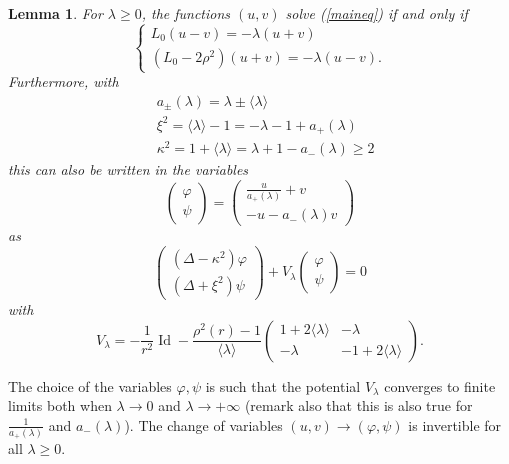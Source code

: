 \documentclass[11 pt]{amsart}
\newtheorem{lem}{Lemma}[section]
\theoremstyle{definition}
\theoremstyle{remark}
\numberwithin{equation}{section}
\begin{document}
\begin{lem}
  \label{pullyou}For $\lambda \geqslant 0$, the functions $(u, v)$ solve
  (\ref{maineq}) if and only if
  \begin{equation}
    \left\{\begin{array}{l}
      L_0 (u - v) = - \lambda (u + v)\\
      (L_0 - 2 \rho^2) (u + v) = - \lambda (u - v) .
    \end{array}\right. \label{maineq2}
  \end{equation}
  Furthermore, with
\begin{align*}
& a_{\pm} (\lambda) = \lambda \pm \langle \lambda \rangle \\
& \xi^2 = \langle \lambda \rangle - 1 = - \lambda - 1 + a_+ (\lambda)
\\ 
&\kappa^2 = 1 + \langle \lambda \rangle = \lambda + 1 - a_-
(\lambda) \geqslant 2
\end{align*}
this can also be written in the variables
  \[ \left(\begin{array}{c}
       \varphi\\
       \psi
     \end{array}\right) = \left(\begin{array}{c}
       \frac{u}{a_+ (\lambda)} + v\\
       - u - a_- (\lambda) v
     \end{array}\right) \]
  as
  \begin{equation}
    \left(\begin{array}{c}
      (\Delta - \kappa^2) \varphi\\
      (\Delta + \xi^2) \psi
    \end{array}\right) + V_{\lambda} \left(\begin{array}{c}
      \varphi\\
      \psi
    \end{array}\right) = 0 \label{maineq3}
  \end{equation}
  with
  \[ V_{\lambda} = - \frac{1}{r^2} \operatorname{Id} - \frac{\rho^2 (r) - 1}{\langle \lambda\rangle} \left(\begin{array}{cc}
       1 + 2 \langle \lambda \rangle & - \lambda\\
       - \lambda & - 1 + 2 \langle \lambda \rangle
     \end{array}\right) . \]
\end{lem}

The choice of the variables $\varphi, \psi$ is such that the potential
$V_{\lambda}$ converges to finite limits both when $\lambda \rightarrow 0$ and
$\lambda \rightarrow + \infty$ (remark also that this is also true for
$\frac{1}{a_+ (\lambda)}$ and $a_- (\lambda)$). The change of variables $(u,
v) \rightarrow (\varphi, \psi)$ is invertible for all $\lambda \geqslant 0$.
\end{document}
